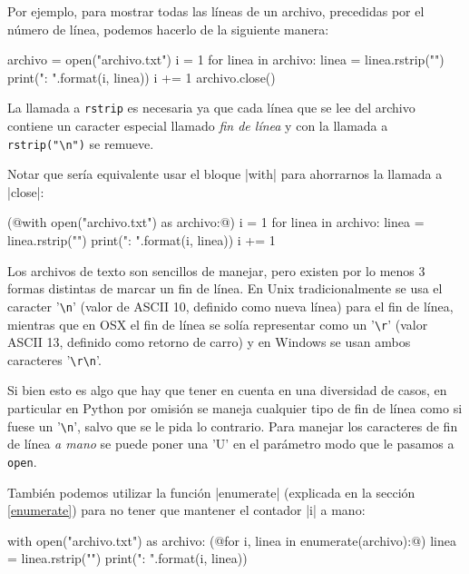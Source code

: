 Por ejemplo, para mostrar todas las líneas de un archivo,
precedidas por el número de línea, podemos hacerlo de la siguiente manera:

\begin{codigo-python-sn}
archivo = open("archivo.txt")
i = 1
for linea in archivo:
    linea = linea.rstrip("\n")
    print("{}: {}".format(i, linea))
    i += 1
archivo.close()
\end{codigo-python-sn}

La llamada a \lstinline!rstrip! es necesaria ya que cada línea que se lee del
archivo contiene un caracter especial llamado {\it fin de línea} y con la llamada a
\lstinline!rstrip("\n")! se remueve.

Notar que sería equivalente usar el bloque |with| para ahorrarnos la llamada a
|close|:

\begin{codigo-python-sn}
(@with open("archivo.txt") as archivo:@)
    i = 1
    for linea in archivo:
        linea = linea.rstrip("\n")
        print("{}: {}".format(i, linea))
        i += 1
\end{codigo-python-sn}

\begin{sabias_que}
Los archivos de texto son sencillos de manejar, pero existen por lo menos 3
formas distintas de marcar un fin de línea. En Unix tradicionalmente se usa
el caracter '\verb!\n!' (valor de ASCII 10, definido como nueva línea) para
el fin de línea, mientras que en OSX el fin de línea se solía
representar como un '\verb!\r!' (valor ASCII 13, definido como retorno de
carro) y en Windows se usan ambos caracteres '\verb!\r\n!'.

Si bien esto es algo que hay que tener en cuenta en una diversidad de
casos, en particular en Python por omisión se maneja cualquier tipo de fin
de línea como si fuese un '\verb!\n!', salvo que se le pida lo contrario.
Para manejar los caracteres de fin de línea \textit{a mano} se puede poner
una 'U' en el parámetro modo que le pasamos a \lstinline!open!.
\end{sabias_que}

También podemos utilizar la función |enumerate| (explicada en la sección
\ref{enumerate}) para no tener que mantener el
contador |i| a mano:

\begin{codigo-python-sn}
with open("archivo.txt") as archivo:
    (@for i, linea in enumerate(archivo):@)
        linea = linea.rstrip("\n")
        print("{}: {}".format(i, linea))
\end{codigo-python-sn}

